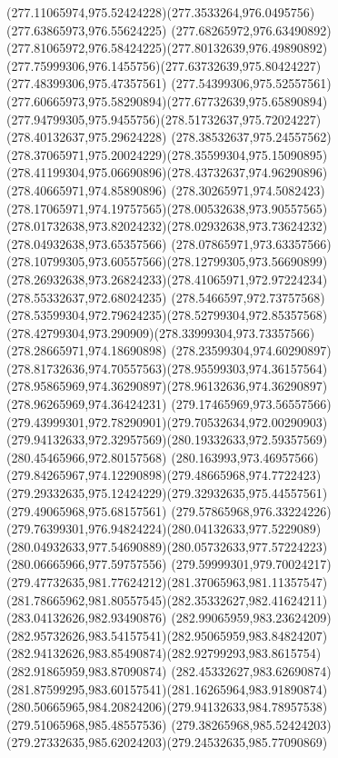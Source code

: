 {    \curveto(277.11065974,975.52424228)(277.3533264,976.0495756)(277.63865973,976.55624225)
    \curveto(277.68265972,976.63490892)(277.81065972,976.58424225)(277.80132639,976.49890892)
    \curveto(277.75999306,976.1455756)(277.63732639,975.80424227)(277.48399306,975.47357561)
    \curveto(277.54399306,975.52557561)(277.60665973,975.58290894)(277.67732639,975.65890894)
    \curveto(277.94799305,975.9455756)(278.51732637,975.72024227)(278.40132637,975.29624228)
    \curveto(278.38532637,975.24557562)(278.37065971,975.20024229)(278.35599304,975.15090895)
    \curveto(278.41199304,975.06690896)(278.43732637,974.96290896)(278.40665971,974.85890896)
    \curveto(278.30265971,974.5082423)(278.17065971,974.19757565)(278.00532638,973.90557565)
    \curveto(278.01732638,973.82024232)(278.02932638,973.73624232)(278.04932638,973.65357566)
    \curveto(278.07865971,973.63357566)(278.10799305,973.60557566)(278.12799305,973.56690899)
    \curveto(278.26932638,973.26824233)(278.41065971,972.97224234)(278.55332637,972.68024235)
    \curveto(278.5466597,972.73757568)(278.53599304,972.79624235)(278.52799304,972.85357568)
    \curveto(278.42799304,973.290909)(278.33999304,973.73357566)(278.28665971,974.18690898)
    \curveto(278.23599304,974.60290897)(278.81732636,974.70557563)(278.95599303,974.36157564)
    \curveto(278.95865969,974.36290897)(278.96132636,974.36290897)(278.96265969,974.36424231)
    \curveto(279.17465969,973.56557566)(279.43999301,972.78290901)(279.70532634,972.00290903)
    \curveto(279.94132633,972.32957569)(280.19332633,972.59357569)(280.45465966,972.80157568)
    \curveto(280.163993,973.46957566)(279.84265967,974.12290898)(279.48665968,974.7722423)
    \curveto(279.29332635,975.12424229)(279.32932635,975.44557561)(279.49065968,975.68157561)
    \curveto(279.57865968,976.33224226)(279.76399301,976.94824224)(280.04132633,977.5229089)
    \curveto(280.04932633,977.54690889)(280.05732633,977.57224223)(280.06665966,977.59757556)
    \curveto(279.59999301,979.70024217)(279.47732635,981.77624212)(281.37065963,981.11357547)
    \curveto(281.78665962,981.80557545)(282.35332627,982.41624211)(283.04132626,982.93490876)
    \curveto(282.99065959,983.23624209)(282.95732626,983.54157541)(282.95065959,983.84824207)
    \curveto(282.94132626,983.85490874)(282.92799293,983.8615754)(282.91865959,983.87090874)
    \curveto(282.45332627,983.62690874)(281.87599295,983.60157541)(281.16265964,983.91890874)
    \curveto(280.50665965,984.20824206)(279.94132633,984.78957538)(279.51065968,985.48557536)
    \curveto(279.38265968,985.52424203)(279.27332635,985.62024203)(279.24532635,985.77090869)
}
